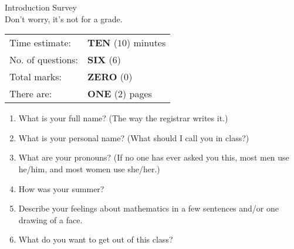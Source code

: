 \documentclass[12pt]{amsart}
\begin{document}
\begin{center}
{\Large Introduction Survey}\\
\vspace{1cm}
Don't worry, it's not for a grade.
\vspace{1cm}
%

\begin{tabular}{@{}ll}
Time estimate:   &        {\rm \bf TEN} ($10$) minutes\\
No. of questions: &  {\rm\bf SIX} ($6$)\\
Total marks: & {\rm \bf ZERO} ($0$)\\
There are: & {\rm \bf ONE} ($2$) pages\\
\end{tabular}

\vspace{1cm}

\end{center}
\vspace{0.5cm}



\begin{enumerate}

\item What is your full name? (The way the registrar writes it.)

\vspace{1cm}


\item What is your personal name? (What should I call you in class?)

\vspace{1cm}

\item What are your pronouns? (If no one has ever asked you this, most men use he/him,
and most women use she/her.)

\vspace{1cm}

\item How was your summer?

\vspace{5cm}

\item Describe your feelings about mathematics in a few sentences and/or one drawing of a face.

\newpage

\item What do you want to get out of this class?

\end{enumerate}
\end{document}
